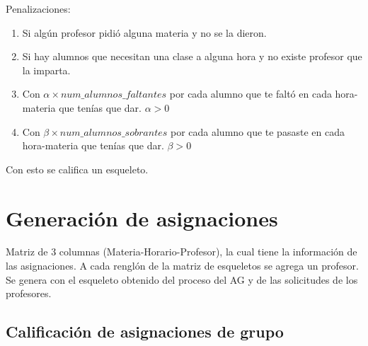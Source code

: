 Penalizaciones:

\begin{enumerate}
\item Si algún profesor pidió alguna materia y no se la dieron.

\item Si hay alumnos que necesitan una clase a alguna hora y no existe profesor que la imparta.

\item Con $\alpha \times num\_alumnos\_faltantes$ por cada alumno que te faltó en cada hora-materia que tenías que dar. $\alpha > 0$

\item Con $\beta \times num\_alumnos\_sobrantes$ por cada alumno que te pasaste en cada hora-materia que tenías que dar. $\beta > 0$

\end{enumerate}


Con esto se califica un esqueleto.


\section{Generación de asignaciones}

Matriz de 3 columnas (Materia-Horario-Profesor), la cual tiene la información de las asignaciones. A cada renglón de la matriz de esqueletos se agrega un profesor. Se genera con el esqueleto obtenido del proceso del AG y de las solicitudes de los profesores.

\subsection{Calificación de asignaciones de grupo}


%
%
%
%





